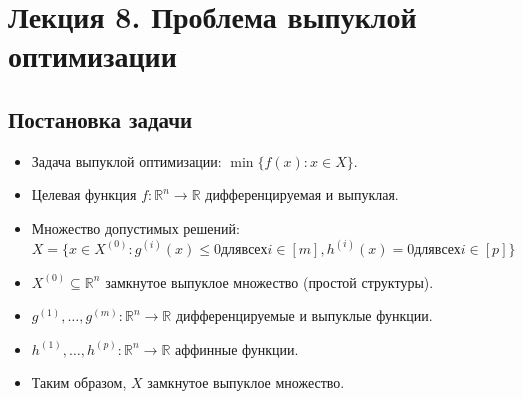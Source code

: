 \section{Лекция 8. Проблема выпуклой оптимизации}


\subsection{Постановка задачи}
\begin{itemize}
    \item Задача выпуклой оптимизации: $\min\{f(x): x\in X\}$.
\end{itemize}
\begin{itemize}
    \item Целевая функция $f:\mathbb{R}^n \rightarrow \mathbb{R}$ дифференцируемая и выпуклая.
\end{itemize}
\begin{itemize}
    \item Множество допустимых решений:\\
$X = \{x \in X^{(0)}: g^{(i)} (x) \leq 0 для всех i\in[m], h^{(i)} (x) = 0 для всех i\in[p]\}$
\end{itemize}
\begin{itemize}
    \item $X^{(0)}\subseteq \mathbb{R}^n$ замкнутое выпуклое множество (простой структуры).
\end{itemize}
\begin{itemize}
    \item $g^{(1)} ,\ldots,g^{(m)}:\mathbb{R}^n \rightarrow \mathbb{R}$ дифференцируемые и выпуклые функции.
\end{itemize}
\begin{itemize}
    \item  $h^{(1)} ,\ldots,h^{(p)}:\mathbb{R}^n \rightarrow \mathbb{R}$ аффинные функции.
\end{itemize}
\begin{itemize}
    \item Таким образом, $X$ замкнутое выпуклое множество.
\end{itemize}

